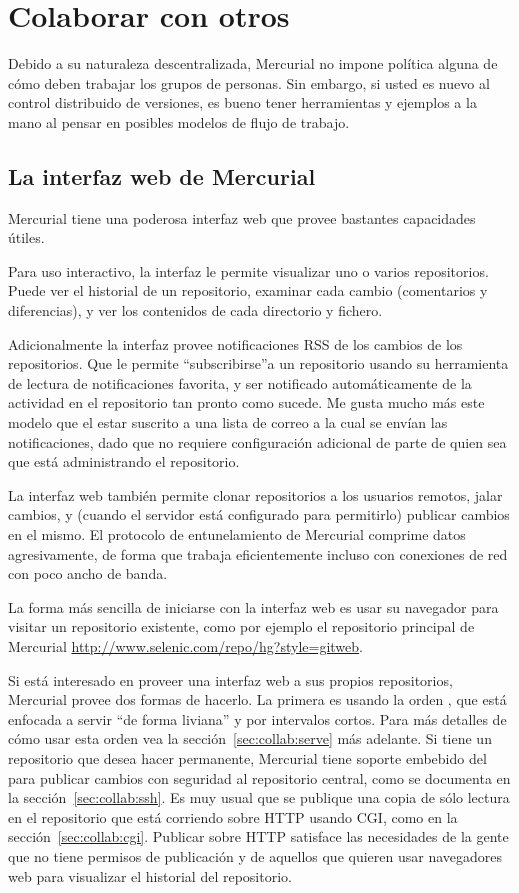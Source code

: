 \chapter{Colaborar con otros}
\label{cha:collab}

Debido a su naturaleza descentralizada, Mercurial no impone política
alguna de cómo deben trabajar los grupos de personas. Sin embargo, si
usted es nuevo al control distribuido de versiones, es bueno tener
herramientas y ejemplos a la mano al pensar en posibles modelos de
flujo de trabajo.

\section{La interfaz web de Mercurial}

Mercurial tiene una poderosa interfaz web que provee bastantes
capacidades útiles.

Para uso interactivo, la interfaz le permite visualizar uno o varios
repositorios. Puede ver el historial de un repositorio, examinar cada
cambio (comentarios y diferencias), y ver los contenidos de cada
directorio y fichero.

Adicionalmente la interfaz provee notificaciones RSS de los cambios de los
repositorios. Que le permite ``subscribirse''a un repositorio usando
su herramienta de lectura de notificaciones favorita, y ser notificado
automáticamente de la actividad en el repositorio tan pronto como
sucede. Me gusta mucho más este modelo que el estar suscrito a una
lista de correo a la cual se envían las notificaciones, dado que no
requiere configuración adicional de parte de quien sea que está
administrando el repositorio.

La interfaz web también permite clonar repositorios a los usuarios
remotos, jalar cambios, y (cuando el servidor está configurado para
permitirlo) publicar cambios en el mismo.  El protocolo de entunelamiento
de Mercurial comprime datos agresivamente, de forma que trabaja
eficientemente incluso con conexiones de red con poco ancho de banda.

La forma más sencilla de iniciarse con la interfaz web es usar su
navegador para visitar un repositorio existente, como por ejemplo el
repositorio principal de Mercurial \url{http://www.selenic.com/repo/hg?style=gitweb}.

Si está interesado en proveer una interfaz web a sus propios
repositorios, Mercurial provee dos formas de hacerlo.  La primera es
usando la orden , que está enfocada a servir ``de forma
liviana'' y por intervalos cortos.  Para más detalles de cómo usar
esta orden vea la sección~\ref{sec:collab:serve} más adelante. Si
tiene un repositorio que desea hacer permanente, Mercurial tiene
soporte embebido del  para publicar cambios con seguridad
al repositorio central, como se documenta en la
sección~\ref{sec:collab:ssh}.  Es muy usual que se publique una copia
de sólo lectura en el repositorio que está corriendo sobre HTTP usando
CGI, como en la sección~\ref{sec:collab:cgi}.  Publicar sobre HTTP
satisface las necesidades de la gente que no tiene permisos de
publicación y de aquellos que quieren usar navegadores web para
visualizar el historial del repositorio.

